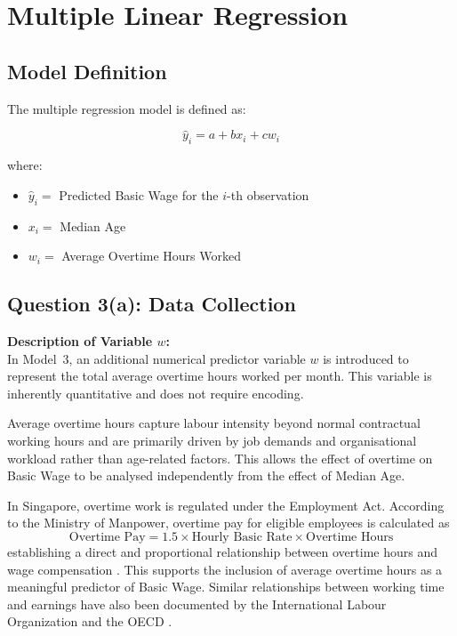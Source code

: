 \documentclass[12pt,a4paper,oneside]{report}
\begin{document}
\section{Multiple Linear Regression}

\subsection{Model Definition}
The multiple regression model is defined as:

\[
\hat{y}_i = a + b x_i + c w_i
\]

where:
\begin{itemize}
    \item $\hat{y}_i =$ Predicted Basic Wage for the $i$-th observation
    \item $x_i =$ Median Age
    \item $w_i =$ Average Overtime Hours Worked
\end{itemize}

\subsection{Question 3(a): Data Collection}

\textbf{Description of Variable $w$:} \\

In Model~3, an additional numerical predictor variable $w$ is introduced to represent
the total average overtime hours worked per month. This variable is inherently
quantitative and does not require encoding.

Average overtime hours capture labour intensity beyond normal contractual working
hours and are primarily driven by job demands and organisational workload rather than
age-related factors. This allows the effect of overtime on Basic Wage to be analysed
independently from the effect of Median Age.

In Singapore, overtime work is regulated under the Employment Act. According to the
Ministry of Manpower, overtime pay for eligible employees is calculated as
\[
\text{Overtime Pay}
= 1.5 \times \text{Hourly Basic Rate} \times \text{Overtime Hours}
\]
establishing a direct and proportional relationship between overtime hours and wage
compensation \cite{mom_overtime}. This supports the inclusion of average overtime hours
as a meaningful predictor of Basic Wage. Similar relationships between working time
and earnings have also been documented by the International Labour Organization and the
OECD \cite{ilo_overtime, oecd_hours}.
\end{document}
